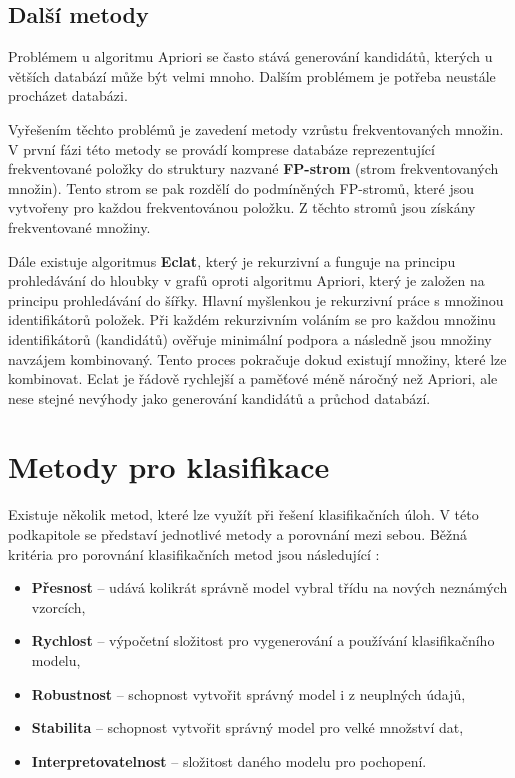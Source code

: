 \subsection*{Další metody}
Problémem u algoritmu Apriori se často stává generování kandidátů, kterých u větších databází může být velmi mnoho. Dalším problémem je potřeba neustále procházet databázi.

Vyřešením těchto problémů je zavedení metody vzrůstu frekventovaných množin. V první fázi této metody se provádí komprese databáze reprezentující frekventované položky do struktury nazvané \textbf{FP-strom} (strom frekventovaných množin). Tento strom se pak rozdělí do podmíněných FP-stromů, které jsou vytvořeny pro každou frekventovánou položku. Z těchto stromů jsou získány frekventované množiny. \cite{Han}

Dále existuje algoritmus \textbf{Eclat}, který je rekurzivní a funguje na principu prohledávání do hloubky v grafů oproti algoritmu Apriori, který je založen na principu prohledávání do šířky. Hlavní myšlenkou je rekurzivní práce s množinou identifikátorů položek. Při každém rekurzivním  voláním se pro každou množinu identifikátorů (kandidátů) ověřuje minimální podpora a následně jsou množiny navzájem kombinovaný. Tento proces pokračuje dokud existují množiny, které lze kombinovat. Eclat je řádově rychlejší a paměťové méně náročný než Apriori, ale nese stejné nevýhody jako generování kandidátů a průchod databází. \cite{Heaton}

\section{Metody pro klasifikace}
Existuje několik metod, které lze využít při řešení klasifikačních úloh. V této podkapitole se představí jednotlivé metody a porovnání mezi sebou.  Běžná kritéria pro porovnání klasifikačních metod jsou následující \cite{Han}:


\begin{itemize}
    \item \textbf{Přesnost} -- udává kolikrát správně model vybral třídu na nových neznámých vzorcích,
    \item \textbf{Rychlost} -- výpočetní složitost pro vygenerování a používání klasifikačního modelu,
    \item \textbf{Robustnost} -- schopnost vytvořit správný model i z neuplných údajů,
    \item \textbf{Stabilita} -- schopnost vytvořit správný model pro velké množství dat,
    \item \textbf{Interpretovatelnost} -- složitost daného modelu pro pochopení.
\end{itemize}

